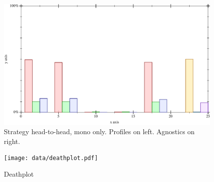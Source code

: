 \begin{figure}[t]
  \includegraphics[width=\columnwidth]{data/strategy-overall.pdf}
  \caption{Strategy head-to-head, mono only. Profiles on left. Agnostics on right.}
  \label{f:strategy-overall}
\end{figure}

\begin{figure}[t]
  \texttt{[image: data/deathplot.pdf]}
  \caption{Deathplot}
  \label{f:deathplot}
\end{figure}

\clearpage

